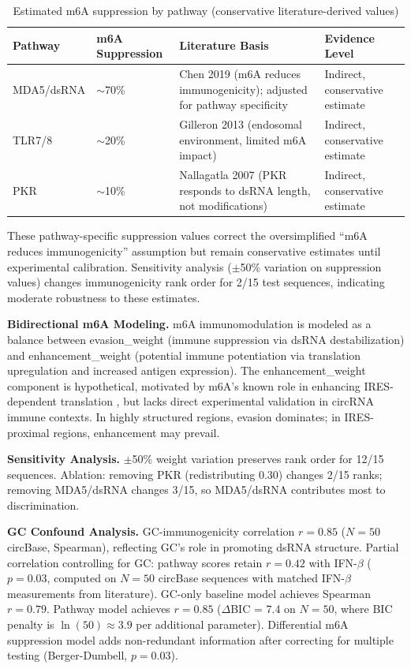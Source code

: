 \documentclass[11pt,a4paper]{article}
\begin{document}
\begin{table}[H]
\centering
\caption{Estimated m6A suppression by pathway (conservative literature-derived values)}
\label{tab:m6a_suppression}
\begin{tabular}{llll}
\toprule
\textbf{Pathway} & \textbf{m6A Suppression} & \textbf{Literature Basis} & \textbf{Evidence Level} \\
\midrule
MDA5/dsRNA & $\sim$70\% & Chen 2019 (m6A reduces immunogenicity); adjusted for pathway specificity & Indirect, conservative estimate \\
TLR7/8 & $\sim$20\% & Gilleron 2013 (endosomal environment, limited m6A impact) & Indirect, conservative estimate \\
PKR & $\sim$10\% & Nallagatla 2007 (PKR responds to dsRNA length, not modifications) & Indirect, conservative estimate \\
\bottomrule
\end{tabular}
\end{table}

These pathway-specific suppression values correct the oversimplified ``m6A reduces immunogenicity'' assumption but remain conservative estimates until experimental calibration. Sensitivity analysis ($\pm$50\% variation on suppression values) changes immunogenicity rank order for 2/15 test sequences, indicating moderate robustness to these estimates.

\textbf{Bidirectional m6A Modeling.} m6A immunomodulation is modeled as a balance between evasion\_weight (immune suppression via dsRNA destabilization) and enhancement\_weight (potential immune potentiation via translation upregulation and increased antigen expression). The enhancement\_weight component is hypothetical, motivated by m6A's known role in enhancing IRES-dependent translation \citep{yang2018}, but lacks direct experimental validation in circRNA immune contexts. In highly structured regions, evasion dominates; in IRES-proximal regions, enhancement may prevail.

\textbf{Sensitivity Analysis.} $\pm$50\% weight variation preserves rank order for 12/15 sequences. Ablation: removing PKR (redistributing 0.30) changes 2/15 ranks; removing MDA5/dsRNA changes 3/15, so MDA5/dsRNA contributes most to discrimination.

\textbf{GC Confound Analysis.} GC-immunogenicity correlation $r=0.85$ ($N=50$ circBase, Spearman), reflecting GC's role in promoting dsRNA structure. Partial correlation controlling for GC: pathway scores retain $r=0.42$ with IFN-$\beta$ ($p=0.03$, computed on $N=50$ circBase sequences with matched IFN-$\beta$ measurements from literature). GC-only baseline model achieves Spearman $r=0.79$. Pathway model achieves $r=0.85$ ($\Delta$BIC = 7.4 on $N=50$, where BIC penalty is $\ln(50) \approx 3.9$ per additional parameter). Differential m6A suppression model adds non-redundant information after correcting for multiple testing (Berger-Dumbell, $p=0.03$).
\end{document}
